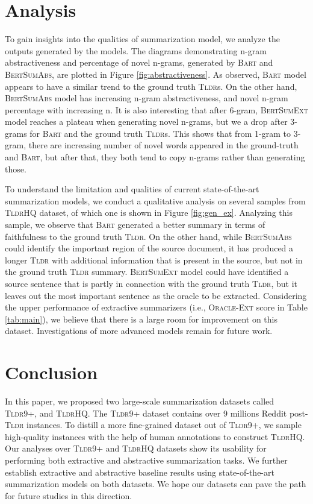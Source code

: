 \documentclass[11pt]{article}
\newcommand{\tldrl}{\textsc{Tldr9+}}
\newcommand{\tldrs}{\textsc{TldrHQ}}
\newcommand{\tldr}{\textsc{Tldr}}
\begin{document}
\section{Analysis}
To gain insights into the qualities of summarization model, we analyze the outputs generated by the models. The diagrams demonstrating n-gram abstractiveness and percentage of novel n-grams, generated by \textsc{Bart} and \textsc{BertSumAbs}, are plotted in Figure \ref{fig:abstractiveness}. As observed, \textsc{Bart} model appears to have a similar trend to the ground truth \tldr s. On the other hand, \textsc{BertSumAbs} model has increasing n-gram abstractiveness, and novel n-gram percentage with increasing n. It is also interesting that after 6-gram, \textsc{BertSumExt} model reaches a plateau when generating novel n-grams, but we a drop after 3-grams for \textsc{Bart} and the ground truth \tldr s. This shows that from 1-gram to 3-gram, there are increasing number of novel words appeared in the ground-truth and \textsc{Bart}, but after that, they both tend to copy n-grams rather than generating those.

To understand the limitation and qualities of current state-of-the-art summarization models, we conduct a qualitative analysis on several samples from \tldrs{} dataset, of which one is shown in Figure \ref{fig:gen_ex}. Analyzing this sample, we observe that \textsc{Bart} generated a better summary in terms of faithfulness to the ground truth \tldr . On the other hand, while \textsc{BertSumAbs} could identify the important region of the source document, it has produced a longer \tldr{} with additional information that is present in the source, but not in the ground truth \tldr{} summary. \textsc{BertSumExt} model could have identified a source sentence that is partly in connection with the ground truth \tldr, but it leaves out the most important sentence as the oracle to be extracted. Considering the upper performance of extractive summarizers (i.e., \textsc{Oracle-Ext} score in Table \ref{tab:main}), we believe that there is a large room for improvement on this dataset. Investigations of more advanced models remain for future work.  \section{Conclusion}

In this paper, we proposed two large-scale summarization datasets called \tldrl, and \tldrs. The \tldrl{} dataset contains over 9 millions Reddit post-\tldr{} instances. To distill a more fine-grained dataset out of \tldrl{}, we sample high-quality instances with the help of human annotations to construct \tldrs . Our analyses over \tldrl{} and \tldrs{} datasets show its usability for performing both extractive and abstractive summarization tasks. We further establish extractive and abstractive baseline results using state-of-the-art summarization models on both datasets. We hope our datasets can pave the path for future studies in this direction. 
\end{document}
